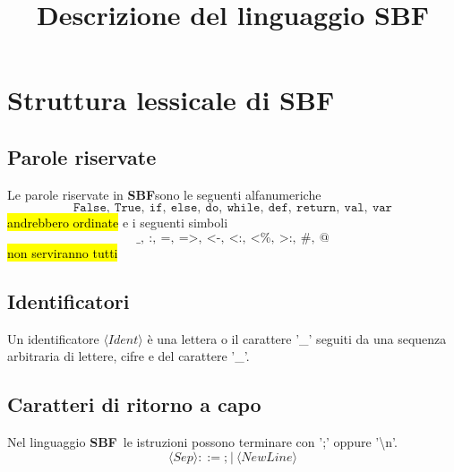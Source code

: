 \documentclass[11pt,a4paper,italian]{article}
\title{Descrizione del linguaggio SBF}
\date{}
\author{}
\newcommand{\SBF}{\textbf{SBF}}
\newcommand{\token}[1]{\langle \mathit{#1} \rangle }
\newcommand{\False}{\texttt{False}}
\newcommand{\True}{\texttt{True}}
\newcommand{\If}{\texttt{if}}
\newcommand{\Else}{\texttt{else}}
\newcommand{\Do}{\texttt{do}}
\newcommand{\While}{\texttt{while}}
\newcommand{\Def}{\texttt{def}}
\newcommand{\Return}{\texttt{return}}
\newcommand{\Val}{\texttt{val}}
\newcommand{\Var}{\texttt{var}}
\begin{document}
	\maketitle
	
	\section{Struttura lessicale di \SBF}
	\subsection*{Parole riservate}
	Le parole riservate in \SBF sono le seguenti alfanumeriche
	\begin{equation}
	\False,\ \True,\ \If,\ \Else,\ \Do,\ \While,\ \Def,\ \Return,\ \Val,\ \Var
	\end{equation}
	\hl{andrebbero ordinate}
	e i seguenti simboli
	\begin{equation}
	\texttt{\_},\ \texttt{:},\ \texttt{=},\ \texttt{=>},\ \texttt{<-},\ \texttt{<:},\ \texttt{<\%},\ \texttt{>:},\ \texttt{\#},\ \texttt{@}
	\end{equation}
	\hl{non serviranno tutti}
	
	\subsection*{Identificatori}

	Un identificatore $\token{Ident}$ è una lettera o il carattere '\_' seguiti da una sequenza arbitraria di lettere, cifre e del carattere '\_'.
	
	\subsection*{Caratteri di ritorno a capo}
	Nel linguaggio \SBF\ le istruzioni possono terminare con ';' oppure '\textbackslash n'. 
	\begin{equation*}
	\token{Sep} ::= \texttt{;}\ |\ \token{NewLine}
	\end{equation*}
	
\end{document}
